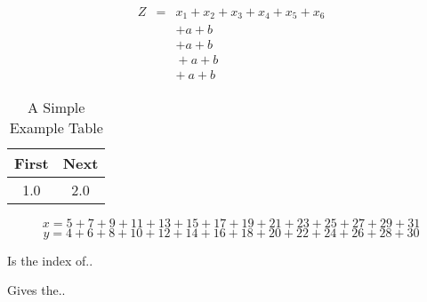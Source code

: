 \documentclass[9pt,technote]{IEEEtran}
\begin{document}
\setlength{\arraycolsep}{0.0em}
\begin{eqnarray}
Z&{}={}&x_1 + x_2 + x_3 + x_4 + x_5 + x_6\nonumber\\
&&+a + b\\
&&+{}a + b\\
&&{}+a + b\\
&&{+}\:a + b
\end{eqnarray}
\setlength{\arraycolsep}{5pt}



\begin{table}[!t]
\renewcommand{\arraystretch}{1.3}
\caption{A Simple Example Table}
\label{table_example}
\centering
\begin{tabular}{c||c}
\hline
\bfseries First & \bfseries Next\\
\hline\hline
1.0 & 2.0\\
\hline
\end{tabular}
\end{table}



\begin{figure*}[!t]
\normalsize
\setcounter{MYtempeqncnt}{\value{equation}}
\setcounter{equation}{5}
\begin{equation}
\label{eqn_dbl_x}
x = 5 + 7 + 9 + 11 + 13 + 15 + 17 + 19 + 21+ 23 + 25
+ 27 + 29 + 31
\end{equation}
\begin{equation}
\label{eqn_dbl_y}
y = 4 + 6 + 8 + 10 + 12 + 14 + 16 + 18 + 20+ 22 + 24
+ 26 + 28 + 30
\end{equation}
\setcounter{equation}{\value{MYtempeqncnt}}
\hrulefill
\vspace*{4pt}
\end{figure*}



\begin{description}[\IEEEsetlabelwidth{$\alpha\omega\pi\theta\mu$}\IEEEusemathlabelsep]
\item[$\gamma\delta\beta$] Is the index of..
\item[$\alpha\omega\pi\theta\mu$] Gives the..
\end{description}
\end{document}
